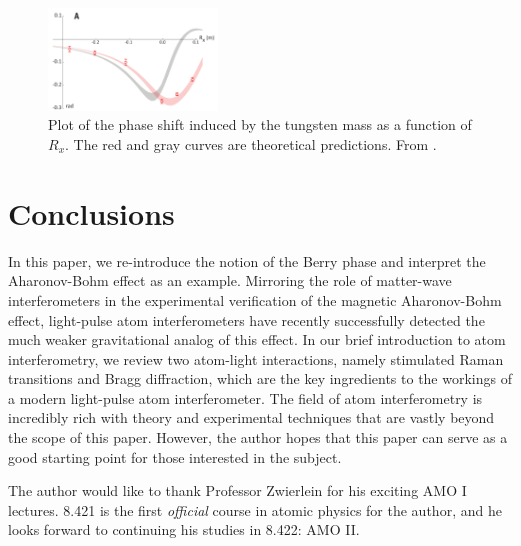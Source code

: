 \documentclass[reprint,
nofootinbib,
amsmath,amssymb,
aps]{revtex4-1}
\begin{document}
\begin{figure}
	\includegraphics[width=0.4\textwidth]{52hbark_edited.png}
	\caption{Plot of the phase shift induced by the tungsten mass as a function of $R_x$. The red and gray curves are theoretical predictions. From \cite{overstreet2022observation}.}
	\label{fig:data}
\end{figure}







\section{Conclusions}


In this paper, we re-introduce the notion of the Berry phase and interpret the Aharonov-Bohm effect as an example. Mirroring the role of matter-wave interferometers in the experimental verification of the magnetic Aharonov-Bohm effect, light-pulse atom interferometers have recently successfully detected the much weaker gravitational analog of this effect. In our brief introduction to atom interferometry, we review two atom-light interactions, namely stimulated Raman transitions and Bragg diffraction, which are the key ingredients to the workings of a modern light-pulse atom interferometer. The field of atom interferometry is incredibly rich with theory and experimental techniques that are vastly beyond the scope of this paper. However, the author hopes that this paper can serve as a good starting point for those interested in the subject. 



\begin{acknowledgments}
	The author would like to thank Professor Zwierlein for his exciting AMO I lectures. 8.421 is the first \textit{official} course in atomic physics for the author, and he looks forward to continuing his studies in 8.422: AMO II. 
\end{acknowledgments}



\end{document}
